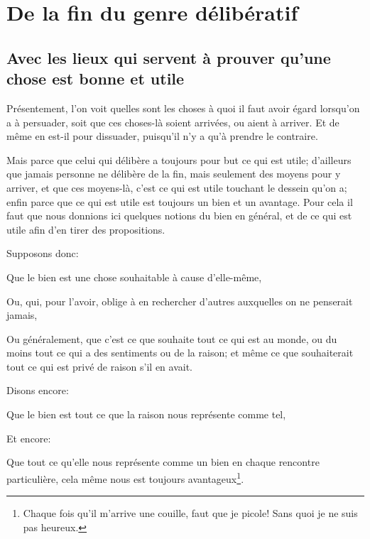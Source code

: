 
\section{De la fin du genre délibératif}
\subsection{Avec les lieux qui servent à prouver qu'une chose est bonne et utile}


Présentement, l'on voit quelles sont les choses à quoi il faut avoir égard lorsqu'on a à persuader, soit que ces choses-là
soient arrivées, ou aient à arriver. Et de même en est-il pour dissuader, puisqu'il n'y a qu'à prendre le contraire. 

Mais parce que celui qui délibère a toujours pour but ce qui est utile; d'ailleurs que jamais personne ne délibère de la
fin, mais seulement des moyens pour y arriver, et que ces moyens-là, c'est ce qui est utile touchant le dessein qu'on a;
enfin parce que ce qui est utile est toujours un bien et un avantage. Pour cela il faut que nous donnions ici quelques
notions du bien en général, et de ce qui est utile afin d'en tirer des propositions.

Supposons donc: 

\begin{emphpar}
	Que le bien est une chose souhaitable à cause d'elle-même,

	Ou, qui, pour l'avoir, oblige à en rechercher d'autres auxquelles on ne penserait jamais,

	Ou généralement, que c'est ce que souhaite tout ce qui est au monde, ou du moins tout ce qui a des sentiments ou de
	la raison; et même ce que souhaiterait tout ce qui est privé de raison s'il en avait.
\end{emphpar}

Disons encore:

\begin{emphpar}
	Que le bien est tout ce que la raison nous représente comme tel,
\end{emphpar}

Et encore:

\begin{emphpar}
	Que tout ce qu'elle nous représente comme un bien en chaque rencontre particulière, cela même nous est toujours
	avantageux\footnote{Chaque fois qu'il m'arrive une couille, faut que je picole! Sans quoi je ne suis pas heureux.}.
\end{emphpar}

